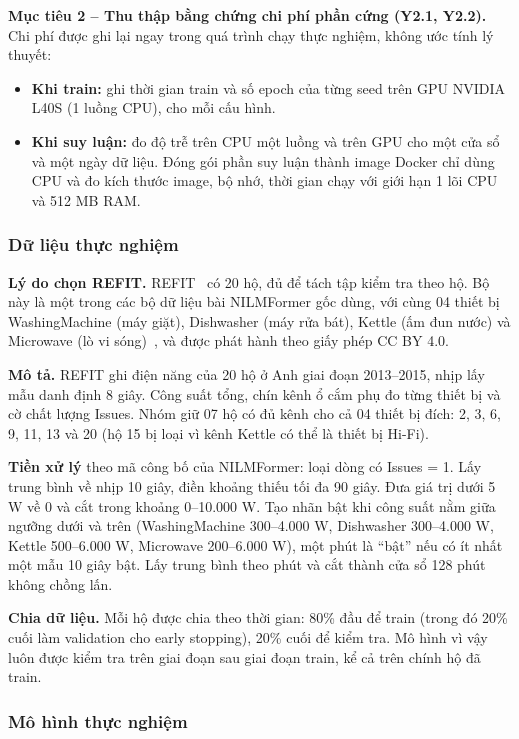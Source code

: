 \textbf{Mục tiêu 2 – Thu thập bằng chứng chi phí phần cứng (Y2.1, Y2.2).} Chi phí được ghi lại ngay trong quá trình chạy thực nghiệm, không ước tính lý thuyết:

\begin{itemize}
\item \textbf{Khi train:} ghi thời gian train và số epoch của từng seed trên GPU NVIDIA L40S (1 luồng CPU), cho mỗi cấu hình.
\item \textbf{Khi suy luận:} đo độ trễ trên CPU một luồng và trên GPU cho một cửa sổ và một ngày dữ liệu. Đóng gói phần suy luận thành image Docker chỉ dùng CPU và đo kích thước image, bộ nhớ, thời gian chạy với giới hạn 1 lõi CPU và 512 MB RAM.
\end{itemize}

\subsubsection{Dữ liệu thực nghiệm}

\textbf{Lý do chọn REFIT.} REFIT~\citep{murray2017} có 20 hộ, đủ để tách tập kiểm tra theo hộ. Bộ này là một trong các bộ dữ liệu bài NILMFormer gốc dùng, với cùng 04 thiết bị WashingMachine (máy giặt), Dishwasher (máy rửa bát), Kettle (ấm đun nước) và Microwave (lò vi sóng)~\citep{petralia2025}, và được phát hành theo giấy phép CC BY 4.0.

\textbf{Mô tả.} REFIT ghi điện năng của 20 hộ ở Anh giai đoạn 2013–2015, nhịp lấy mẫu danh định 8 giây. Công suất tổng, chín kênh ổ cắm phụ đo từng thiết bị và cờ chất lượng Issues. Nhóm giữ 07 hộ có đủ kênh cho cả 04 thiết bị đích: 2, 3, 6, 9, 11, 13 và 20 (hộ 15 bị loại vì kênh Kettle có thể là thiết bị Hi-Fi).

\textbf{Tiền xử lý} theo mã công bố của NILMFormer: loại dòng có Issues = 1. Lấy trung bình về nhịp 10 giây, điền khoảng thiếu tối đa 90 giây. Đưa giá trị dưới 5 W về 0 và cắt trong khoảng 0–10.000 W. Tạo nhãn bật khi công suất nằm giữa ngưỡng dưới và trên (WashingMachine 300–4.000 W, Dishwasher 300–4.000 W, Kettle 500–6.000 W, Microwave 200–6.000 W), một phút là “bật” nếu có ít nhất một mẫu 10 giây bật. Lấy trung bình theo phút và cắt thành cửa sổ 128 phút không chồng lấn.

\textbf{Chia dữ liệu.} Mỗi hộ được chia theo thời gian: 80\% đầu để train (trong đó 20\% cuối làm validation cho early stopping), 20\% cuối để kiểm tra. Mô hình vì vậy luôn được kiểm tra trên giai đoạn sau giai đoạn train, kể cả trên chính hộ đã train.

\subsubsection{Mô hình thực nghiệm}

